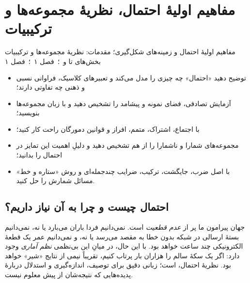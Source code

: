\chapter{مفاهیم اولیهٔ احتمال، نظریهٔ مجموعه‌ها و ترکیبیات}
\label{ch:s1}

{مفاهیم اولیهٔ احتمال و زمینه‌های شکل‌گیری؛ مقدمات: نظریهٔ مجموعه‌ها و ترکیبیات}
{ بخش‌های  تا  و  \,؛\,  فصل ۱ \,؛\,  فصل ۱}
{\begin{itemize}
  \item توضیح دهید «احتمال» چه چیزی را مدل می‌کند و تعبیرهای کلاسیک، فراوانی نسبی و ذهنی چه تفاوتی دارند؛
  \item آزمایش تصادفی، فضای نمونه و پیشامد را تشخیص دهید و با زبان مجموعه‌ها بنویسید؛
  \item با اجتماع، اشتراک، متمم، افراز و قوانین دمورگان راحت کار کنید؛
  \item مجموعه‌های شمارا و ناشمارا را از هم تشخیص دهید و دلیلِ اهمیت این تمایز در احتمال را بدانید؛
  \item با اصل ضرب، جایگشت، ترکیب، ضرایب چندجمله‌ای و روش «ستاره و خط» مسائل شمارش را حل کنید.
\end{itemize}}

\section{احتمال چیست و چرا به آن نیاز داریم؟}

جهان پیرامون ما پر از \emph{عدم قطعیت} است. نمی‌دانیم فردا باران می‌بارد یا نه، نمی‌دانیم بستهٔ ارسالی در شبکه بدون خطا به مقصد می‌رسد یا نه، و نمی‌دانیم عمر یک قطعهٔ الکترونیکی چند ساعت خواهد بود. با این حال، در میانِ این بی‌نظمی \emph{نظم آماری} وجود دارد: اگر یک سکهٔ سالم را هزاران بار پرتاب کنیم، تقریباً نیمی از نتایج «شیر» خواهد بود. نظریهٔ احتمال،  است؛ زبانی دقیق برای توصیف، اندازه‌گیری و استدلال دربارهٔ پدیده‌هایی که نتیجه‌شان از پیش معلوم نیست.

